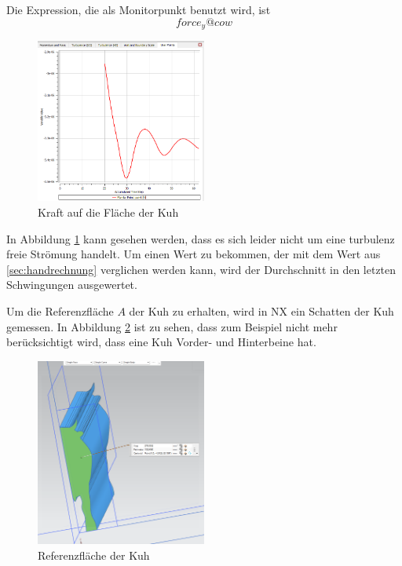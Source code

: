 \documentclass[a4paper,12pt]{article}
\begin{document}
Die Expression, die als Monitorpunkt benutzt wird, ist
$$ force_y@cow$$

\begin{figure}[h]
    \centering
    \includegraphics[width=0.5\textwidth]{force.PNG}
    \caption{Kraft auf die Fläche der Kuh}
    \label{fig:F}
\end{figure}

In Abbildung \ref{fig:F} kann gesehen werden, dass es sich leider nicht um eine turbulenz freie Strömung handelt. Um einen Wert zu bekommen, der mit dem Wert aus \ref{sec:handrechnung} verglichen werden kann, wird der Durchschnitt in den letzten Schwingungen ausgewertet.

Um die Referenzfläche \( A \) der Kuh zu erhalten, wird in NX ein Schatten der Kuh gemessen. In Abbildung \ref{fig:A} ist zu sehen, dass zum Beispiel nicht mehr berücksichtigt wird, dass eine Kuh Vorder- und Hinterbeine hat.

\begin{figure}[h]
    \centering
    \includegraphics[width=0.5\textwidth]{surface.PNG}
    \caption{Referenzfläche der Kuh}
    \label{fig:A}
\end{figure}

\newpage
\end{document}
